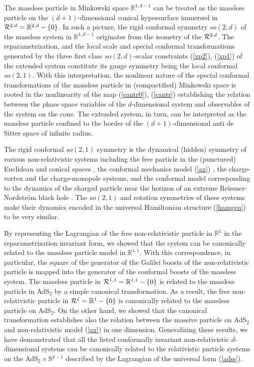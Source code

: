 \documentclass[a4paper,12pt]{article}
\def\R{\mathbb R}
\begin{document}
The massless particle in
Minkowski space $\R^{1,d-1}$
can be treated as the massless particle
on the $(d+1)$-dimensional conical
hypersurface immersed in
${\cal R}^{2,d}=\R^{2,d}-\{0\}$.
In such a picture,
the rigid conformal symmetry $so(2,d)$
of the massless system in $\R^{1,d-1}$
originates from the isometry of the ${\cal R}^{2,d}$.
The reparametrization, and the local scale and
special conformal transformations
generated by the three
first class $so(2,d)$-scalar
constraints (\ref{xp2}), (\ref{xp1})
of the extended system
constitute its gauge symmetry being the
local conformal $so(2,1)$.
With this interpretation,
the nonlinear nature of the special
conformal transformations of the massless particle
in (compactified) Minkowski space
is rooted in the nonlinearity
of the map (\ref{cantr0}),
(\ref{cantr}) establishing the relation between the
phase space variables of the $d$-dimensional system
and observables of the
system on the cone.
The extended system, in turn,  can be interpreted
as the massless particle
confined to the border of the $(d+1)$-dimensional
anti de Sitter space
of infinite radius.

The rigid conformal $so(2,1)$ symmetry
is  the dynamical (hidden) symmetry of various
non-relativistic systems including the
free particle in the (punctured) Euclidean
and conical spaces \cite{Des},
the conformal mechanics model (\ref{ax}) \cite{AFF},
the charge-vortex \cite{Jackv} and the charge-monopole
\cite{Jackm,mp}
systems, and the conformal model
corresponding to the dynamics of the
charged particle near the horizon of an extreme
Reissner-Nordstr\"om black hole \cite{kallosh}.
The $so(2,1)$ and rotation symmetries
of these systems
make their dynamics
encoded in the universal Hamiltonian
structure (\ref{hamgen})
to be very similar.


By representing the Lagrangian of the
free non-relativistic particle
in $\R^1$ in the reparametrization invariant form,
we showed that the system
can be canonically related
to the massless particle model in $\R^{1,1}$.
With this correspondence, in particular, the square
of the generator of the Galilei boosts of the
non-relativistic particle is mapped into the
generator of the conformal boosts
of the massless system.
The massless particle in ${\cal R}^{1,1}=\R^{1,1}-\{0\}$
is related to the massless particle
in AdS${}_2$ by a simple canonical transformation.
As a result, the free non-relativistic particle
in ${\cal R}^1=\R^1-\{0\}$ is canonically related
to the massless particle on AdS${}_2$.
On the other hand, we showed that the
canonical transformation establishes also
the relation between the massive particle
on AdS${}_2$ and non-relativistic model
(\ref{ax}) in one dimension.
Generalizing these results,
we have demonstrated that
all the listed conformally invariant
non-relativistic $d$-dimensional systems
can be canonically related
to the relativistic particle systems
on the AdS${}_2\times$S${}^{d-1}$
described by the Lagrangian of the
universal form (\ref{adss}).
\end{document}
